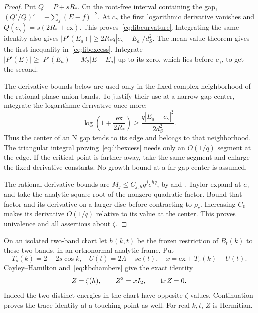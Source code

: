 \begin{proof}
Put $Q=P+sR_*$. On the root-free interval containing the gap,
$(Q'/Q)'=-\sum_f(E-f)^{-2}$. At $c_\gamma$ the first logarithmic
derivative vanishes and $Q(c_\gamma)=s(2R_*+\mathrm{ex})$.
This proves~\eqref{eq:libcurvature}. Integrating the same identity
also gives $|P'(E_a)|\ge2R_*q|c_\gamma-E_a|/d_S^2$.
The mean-value theorem gives the first inequality
in~\eqref{eq:libexcess}. Integrate
$|P'(E)|\ge |P'(E_a)|-M_2|E-E_a|$ up to its zero, which lies before
$c_\gamma$, to get the second.

The derivative bounds below are used only in the fixed complex neighborhood of the rational phase-union bands. To justify their use at a narrow-gap center, integrate the logarithmic derivative once more:
\[
 \log\left(1+\frac{\mathrm{ex}}{2R_*}\right)
 \ge\frac{q|E_a-c_\gamma|^2}{2d_S^2}.
\]
Thus the center of an N gap tends to its edge and belongs to that neighborhood. The triangular integral proving~\eqref{eq:libexcess} needs only an $O(1/q)$ segment at the edge. If the critical point is farther away, take the same segment and enlarge the fixed derivative constants. No growth bound at a far gap center is assumed.

The rational derivative bounds are
$M_j\le C_{j,h}q^j e^{hq}$, by
\cite[Proposition 3.3(2)]{DMamo} and
\cite[Appendix A, Polynomial derivatives and the top contour]{DMband}.
Taylor-expand at $c_\gamma$ and take the analytic square root of the
nonzero quadratic factor. Bound that factor and its derivative on
a larger disc before contracting to $\rho_c$. Increasing $C_0$
makes its derivative $O(1/q)$ relative to its value at the center.
This proves univalence and all assertions about $\zeta$.
\end{proof}

On an isolated two-band chart let $h(k,t)$ be the frozen restriction
of $B_t(k)$ to these two bands, in an orthonormal analytic frame.
Put
\[
 T_s(k)=2-2s\cos k,\quad U(t)=2\Lambda-sc(t),\quad
 x=\mathrm{ex}+T_s(k)+U(t).
\]
Cayley--Hamilton and~\eqref{eq:libchambers} give the exact identity
\begin{equation}\label{eq:libDirac}
 Z=\zeta(h),\qquad Z^2=xI_2,\qquad \operatorname{tr} Z=0.
\end{equation}
Indeed the two distinct energies in the chart have opposite
$\zeta$-values. Continuation proves the trace identity at a touching
point as well. For real $k,t$, $Z$ is Hermitian.

